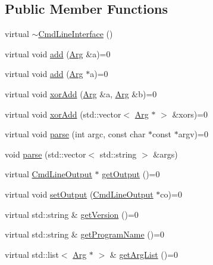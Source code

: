 \subsection*{Public Member Functions}
\begin{DoxyCompactItemize}
\item 
virtual \hyperlink{class_t_c_l_a_p_1_1_cmd_line_interface_a8c7faeca5a25a96e18312da9485a94e9}{$\sim$\+Cmd\+Line\+Interface} ()
\item 
virtual void \hyperlink{class_t_c_l_a_p_1_1_cmd_line_interface_a13b29ab754c030185e58f779dc355631}{add} (\hyperlink{class_t_c_l_a_p_1_1_arg}{Arg} \&a)=0
\item 
virtual void \hyperlink{class_t_c_l_a_p_1_1_cmd_line_interface_a7c6a097c0f2a09dd1987e9da1af8b457}{add} (\hyperlink{class_t_c_l_a_p_1_1_arg}{Arg} $\ast$a)=0
\item 
virtual void \hyperlink{class_t_c_l_a_p_1_1_cmd_line_interface_a69859e3713623eb06c9c335248d9c83f}{xor\+Add} (\hyperlink{class_t_c_l_a_p_1_1_arg}{Arg} \&a, \hyperlink{class_t_c_l_a_p_1_1_arg}{Arg} \&b)=0
\item 
virtual void \hyperlink{class_t_c_l_a_p_1_1_cmd_line_interface_a6a94140e522bcf6104928fcf0c434ab8}{xor\+Add} (std\+::vector$<$ \hyperlink{class_t_c_l_a_p_1_1_arg}{Arg} $\ast$ $>$ \&xors)=0
\item 
virtual void \hyperlink{class_t_c_l_a_p_1_1_cmd_line_interface_a6649336bddfc8421148718a691fd89b4}{parse} (int argc, const char $\ast$const $\ast$argv)=0
\item 
void \hyperlink{class_t_c_l_a_p_1_1_cmd_line_interface_a1b1a0cb973206a11c22003c245a4f7ed}{parse} (std\+::vector$<$ std\+::string $>$ \&args)
\item 
virtual \hyperlink{class_t_c_l_a_p_1_1_cmd_line_output}{Cmd\+Line\+Output} $\ast$ \hyperlink{class_t_c_l_a_p_1_1_cmd_line_interface_aebc72daedeaeb03e06bb2e6e0f00363d}{get\+Output} ()=0
\item 
virtual void \hyperlink{class_t_c_l_a_p_1_1_cmd_line_interface_ab208b32bd9489781509d7ecddf8a92a0}{set\+Output} (\hyperlink{class_t_c_l_a_p_1_1_cmd_line_output}{Cmd\+Line\+Output} $\ast$co)=0
\item 
virtual std\+::string \& \hyperlink{class_t_c_l_a_p_1_1_cmd_line_interface_a0a552fa57212800dfb8aec84fb07b8bb}{get\+Version} ()=0
\item 
virtual std\+::string \& \hyperlink{class_t_c_l_a_p_1_1_cmd_line_interface_a1a5672df72a6b5021cd70b37c4dbd0a7}{get\+Program\+Name} ()=0
\item 
virtual std\+::list$<$ \hyperlink{class_t_c_l_a_p_1_1_arg}{Arg} $\ast$ $>$ \& \hyperlink{class_t_c_l_a_p_1_1_cmd_line_interface_a4de8d988f5a6f3007c4dfb0fc9dad476}{get\+Arg\+List} ()=0

\end{DoxyCompactItemize}
